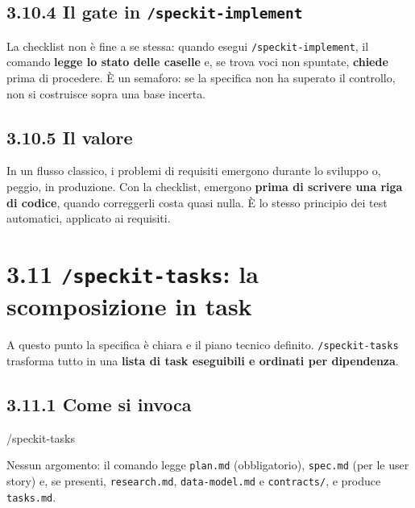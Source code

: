 \documentclass[
  italian,
  10pt,
]{book}
\newenvironment{Shaded}{\begin{snugshade}}{\end{snugshade}}
\newcommand{\NormalTok}[1]{#1}
\begin{document}
\subsection{\texorpdfstring{3.10.4 Il gate in
\texttt{/speckit-implement}}{3.10.4 Il gate in /speckit-implement}}\label{il-gate-in-speckit-implement}

La checklist non è fine a se stessa: quando esegui
\texttt{/speckit-implement}, il comando \textbf{legge lo stato delle
caselle} e, se trova voci non spuntate, \textbf{chiede} prima di
procedere. È un semaforo: se la specifica non ha superato il controllo,
non si costruisce sopra una base incerta.

\subsection{3.10.5 Il valore}\label{il-valore}

In un flusso classico, i problemi di requisiti emergono durante lo
sviluppo o, peggio, in produzione. Con la checklist, emergono
\textbf{prima di scrivere una riga di codice}, quando correggerli costa
quasi nulla. È lo stesso principio dei test automatici, applicato ai
requisiti.

\section{\texorpdfstring{3.11 \texttt{/speckit-tasks}: la scomposizione
in
task}{3.11 /speckit-tasks: la scomposizione in task}}\label{speckit-tasks-la-scomposizione-in-task}

A questo punto la specifica è chiara e il piano tecnico definito.
\texttt{/speckit-tasks} trasforma tutto in una \textbf{lista di task
eseguibili e ordinati per dipendenza}.

\subsection{3.11.1 Come si invoca}\label{come-si-invoca-2}

\begin{Shaded}
\begin{Highlighting}[]
\NormalTok{/speckit{-}tasks}
\end{Highlighting}
\end{Shaded}

Nessun argomento: il comando legge \texttt{plan.md} (obbligatorio),
\texttt{spec.md} (per le user story) e, se presenti,
\texttt{research.md}, \texttt{data-model.md} e \texttt{contracts/}, e
produce \texttt{tasks.md}.
\end{document}
